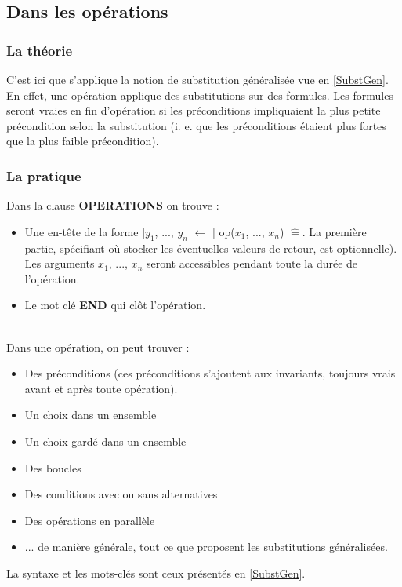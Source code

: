 \documentclass[10pt,a4paper]{article}
\newcommand{\Bequal}{\mathrel{\widehat{=}}}
\begin{document}
\subsection{Dans les opérations}

\subsubsection{La théorie}

C'est ici que s'applique la notion de substitution généralisée vue en \cref{SubstGen}. En effet, une opération applique des substitutions sur des formules. Les formules seront vraies en fin d'opération si les préconditions impliquaient la plus petite précondition selon la substitution (i. e. que les préconditions étaient plus fortes que la plus faible précondition).


\subsubsection{La pratique}

Dans la clause \textbf{OPERATIONS} on trouve :
\begin{itemize}
\item Une en-tête de la forme [$y_{1}$, ..., $y_{n}$ $\leftarrow$ ] op($x_{1}$, ..., $x_{n}$) $\Bequal$. La première partie, spécifiant où stocker les éventuelles valeurs de retour, est optionnelle). Les arguments $x_{1}$, ..., $x_{n}$ seront accessibles pendant toute la durée de l'opération.
\item Le mot clé \textbf{END} qui clôt l'opération.
\end{itemize}
~\\
Dans une opération, on peut trouver :
\begin{itemize}
\item Des préconditions
(ces préconditions s'ajoutent aux invariants, toujours vrais avant et après toute opération).
\item Un choix dans un ensemble
\item Un choix gardé dans un ensemble
\item Des boucles
\item Des conditions avec ou sans alternatives
\item Des opérations en parallèle
\item ... de manière générale, tout ce que proposent les substitutions généralisées.
\end{itemize}

La syntaxe et les mots-clés sont ceux présentés en \cref{SubstGen}.
\end{document}
